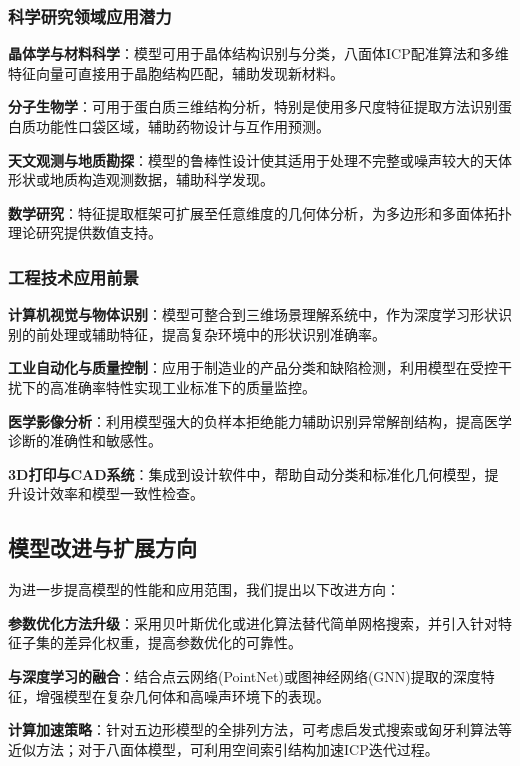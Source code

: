 \subsubsection{科学研究领域应用潜力}


     \textbf{晶体学与材料科学}：模型可用于晶体结构识别与分类，八面体ICP配准算法和多维特征向量可直接用于晶胞结构匹配，辅助发现新材料。
    
     \textbf{分子生物学}：可用于蛋白质三维结构分析，特别是使用多尺度特征提取方法识别蛋白质功能性口袋区域，辅助药物设计与互作用预测。
    
     \textbf{天文观测与地质勘探}：模型的鲁棒性设计使其适用于处理不完整或噪声较大的天体形状或地质构造观测数据，辅助科学发现。
    
     \textbf{数学研究}：特征提取框架可扩展至任意维度的几何体分析，为多边形和多面体拓扑理论研究提供数值支持。


\subsubsection{工程技术应用前景}


     \textbf{计算机视觉与物体识别}：模型可整合到三维场景理解系统中，作为深度学习形状识别的前处理或辅助特征，提高复杂环境中的形状识别准确率。
    
     \textbf{工业自动化与质量控制}：应用于制造业的产品分类和缺陷检测，利用模型在受控干扰下的高准确率特性实现工业标准下的质量监控。
    
     \textbf{医学影像分析}：利用模型强大的负样本拒绝能力辅助识别异常解剖结构，提高医学诊断的准确性和敏感性。
    
     \textbf{3D打印与CAD系统}：集成到设计软件中，帮助自动分类和标准化几何模型，提升设计效率和模型一致性检查。


\subsection{模型改进与扩展方向}

为进一步提高模型的性能和应用范围，我们提出以下改进方向：


     \textbf{参数优化方法升级}：采用贝叶斯优化或进化算法替代简单网格搜索，并引入针对特征子集的差异化权重，提高参数优化的可靠性。
    
     \textbf{与深度学习的融合}：结合点云网络(PointNet)或图神经网络(GNN)提取的深度特征，增强模型在复杂几何体和高噪声环境下的表现。
    
     \textbf{计算加速策略}：针对五边形模型的全排列方法，可考虑启发式搜索或匈牙利算法等近似方法；对于八面体模型，可利用空间索引结构加速ICP迭代过程。
    
